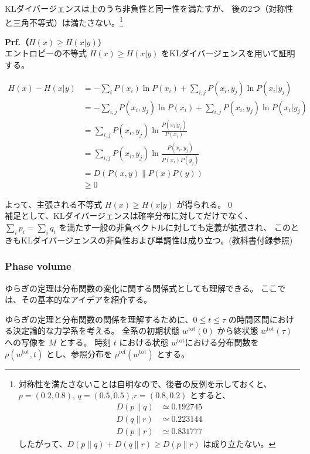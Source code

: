 \documentclass[a4paper,11pt]{jsarticle}
\numberwithin{equation}{section}
\begin{document}
KLダイバージェンスは上のうち非負性と同一性を満たすが、
後の2つ（対称性と三角不等式）は満たさない。\footnote{
    対称性を満たさないことは自明なので、後者の反例を示しておくと、
    $p = (0.2, 0.8)$, $q = (0.5, 0.5)$,$ r = (0.8, 0.2)$ とすると、
    \begin{align}
    D(p \| q) &\simeq 0.192745 \\
    D(q \| r) &\simeq 0.223144 \\
    D(p \| r) &\simeq 0.831777
    \end{align}
    したがって、$D(p \| q) + D(q \| r) \geq D(p \| r)$ は成り立たない。
}

\textbf{Prf.（\( H(x) \geq H(x|y) \))}\\
エントロピーの不等式 \( H(x) \geq H(x|y) \) をKLダイバージェンスを用いて証明する。

\begin{align}
H(x) - H(x|y)
&= - \sum_i P(x_i) \ln P(x_i) + \sum_{i,j} P(x_i, y_j) \ln P(x_i|y_j) \\
&= - \sum_{i,j} P(x_i, y_j) \ln P(x_i) + \sum_{i,j} P(x_i, y_j) \ln P(x_i|y_j) \\
&= \sum_{i,j} P(x_i, y_j) \ln \frac{P(x_i|y_j)}{P(x_i)} \\
&= \sum_{i,j} P(x_i, y_j) \ln \frac{P(x_i, y_j)}{P(x_i) P(y_j)} \\
&= D(P(x, y) \| P(x) P(y)) \\
&\geq 0
\end{align}

よって、主張される不等式 \( H(x) \geq H(x|y) \) が得られる。\qed\\

補足として、KLダイバージェンスは確率分布に対してだけでなく、
$\sum_i p_i = \sum_i q_i$ を満たす一般の非負ベクトルに対しても定義が拡張され、
このときもKLダイバージェンスの非負性および単調性は成り立つ。(教科書付録参照)

\subsubsection{Phase volume}

ゆらぎの定理は分布関数の変化に関する関係式としても理解できる。
ここでは、その基本的なアイデアを紹介する。

ゆらぎの定理と分布関数の関係を理解するために、$0 \leq t \leq \tau$ の時間区間における決定論的な力学系を考える。
全系の初期状態 $w^{\mathrm{tot}}(0)$ から終状態 $w^{\mathrm{tot}}(\tau)$ への写像を $M$ とする。
時刻 $t$ における状態 $w^{\mathrm{tot}}$における分布関数を $\rho(w^{\mathrm{tot}}, t)$ とし、参照分布を $\rho^{\mathrm{ref}}(w^{\mathrm{tot}})$ とする。
\end{document}
